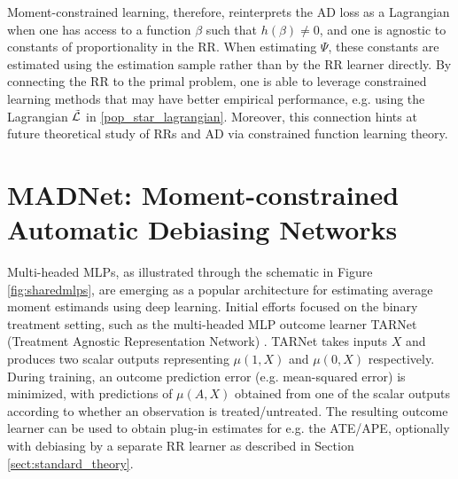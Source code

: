 Moment-constrained learning, therefore, reinterprets the AD loss as a Lagrangian when one has access to a function $\beta$ such that $h(\beta) \neq 0$, and one is agnostic to constants of proportionality in the RR. When estimating $\Psi$, these constants are estimated using the estimation sample rather than by the RR learner directly. By connecting the RR to the primal problem, one is able to leverage constrained learning methods that may have better empirical performance, e.g. using the Lagrangian $\Tilde{\mathcal{L}}$ in \eqref{pop_star_lagrangian}. Moreover, this connection hints at future theoretical study of RRs and AD via constrained function learning theory.







\section{MADNet: Moment-constrained Automatic Debiasing Networks}

Multi-headed MLPs, as illustrated through the schematic in Figure \ref{fig:sharedmlps}, are emerging as a popular architecture for estimating average moment estimands using deep learning. Initial efforts focused on the binary treatment setting, such as the multi-headed MLP outcome learner TARNet (Treatment Agnostic Representation Network) \citep{Shalit2017}. TARNet takes inputs $X$ and produces two scalar outputs representing $\mu(1, X)$ and $\mu(0, X)$ respectively. During training, an outcome prediction error (e.g. mean-squared error) is minimized, with predictions of $\mu(A,X)$ obtained from one of the scalar outputs according to whether an observation is treated/untreated. The resulting outcome learner can be used to obtain plug-in estimates for e.g. the ATE/APE, optionally with debiasing by a separate RR learner as described in Section \ref{sect:standard_theory}.

